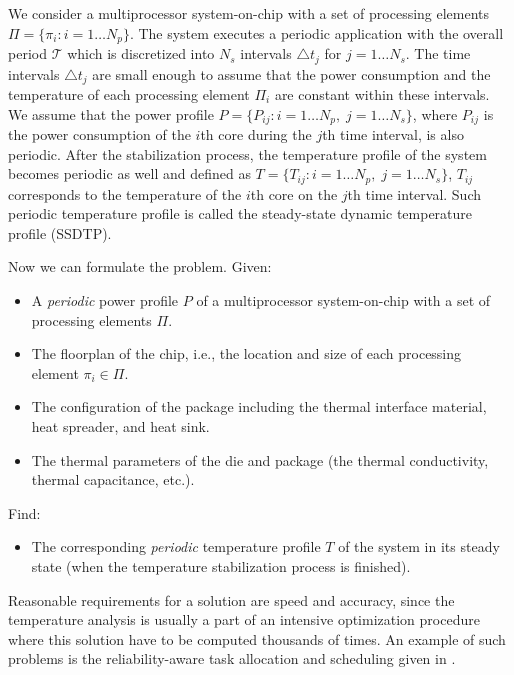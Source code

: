 We consider a multiprocessor system-on-chip with a set of processing elements $\Pi = \{ \pi_i: i = 1 \dots N_p \}$. The system executes a periodic application with the overall period $\mathcal{T}$ which is discretized into $N_s$ intervals $\triangle t_j$ for $j = 1 \dots N_s$. The time intervals $\triangle t_j$ are small enough to assume that the power consumption and the temperature of each processing element $\Pi_i$ are constant within these intervals. We assume that the power profile $P = \{ P_{ij}: i = 1 \dots N_p, \; j = 1 \dots N_s \}$, where $P_{ij}$ is the power consumption of the $i$th core during the $j$th time interval, is also periodic. After the stabilization process, the temperature profile of the system becomes periodic as well and defined as $T = \{ T_{ij}: i = 1 \dots N_p, \; j = 1 \dots N_s \}$, ${T_{ij}}$ corresponds to the temperature of the ${i}$th core on the $j$th time interval. Such periodic temperature profile is called the steady-state dynamic temperature profile (SSDTP).

Now we can formulate the problem. Given:
\begin{itemize}
  \item A \emph{periodic} power profile $P$ of a multiprocessor system-on-chip with a set of processing elements $\Pi$.
  \item The floorplan of the chip, i.e., the location and size of each processing element $\pi_i \in \Pi$.
  \item The configuration of the package including the thermal interface material, heat spreader, and heat sink.
  \item The thermal parameters of the die and package (the thermal conductivity, thermal capacitance, etc.).
\end{itemize}
Find:
\begin{itemize}
  \item The corresponding \emph{periodic} temperature profile $T$ of the system in its steady state (when the temperature stabilization process is finished).
\end{itemize}

Reasonable requirements for a solution are speed and accuracy, since the temperature analysis is usually a part of an intensive optimization procedure where this solution have to be computed thousands of times. An example of such problems is the reliability-aware task allocation and scheduling given in .
